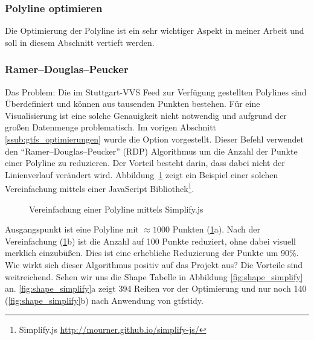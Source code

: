 \subsubsection{Polyline optimieren}
\label{ssub:polyline_optimieren}

  Die Optimierung der Polyline ist ein sehr wichtiger Aspekt in meiner Arbeit und soll in diesem Abschnitt vertieft werden.

  \subsubsection*{Ramer–Douglas–Peucker}
  \label{ssub:ramer_douglas_peucker}
    Das Problem: Die im Stuttgart-VVS Feed zur Verfügung gestellten Polylines sind Überdefiniert und können aus tausenden Punkten bestehen. Für eine Visualisierung ist eine solche Genauigkeit nicht notwendig und aufgrund der großen Datenmenge problematisch. Im vorigen Abschnitt \ref{ssub:gtfs_optimierungen} wurde die Option \colorbox{materialGrey}{\texttt{\color{white}{-s}}} vorgestellt. Dieser Befehl verwendet den "`Ramer–Douglas–Peucker"' (RDP) Algorithmus um die Anzahl der Punkte einer Polyline zu reduzieren. Der Vorteil besteht darin, dass dabei nicht der Linienverlauf verändert wird. Abbildung~\ref{fig:simplify} zeigt ein Beispiel einer solchen Vereinfachung mittels einer JavaScript Bibliothek\footnote{Simplify.js \url{http://mourner.github.io/simplify-js/}}.

    \begin{figure}[htbp]
      \centering
      \hfill
      \caption{Vereinfachung einer Polyline mittels Simplify.js}
      \label{fig:simplify}
    \end{figure}

    Ausgangspunkt ist eine Polyline mit $\approx1000$ Punkten (\ref{fig:simplify}a). Nach der Vereinfachung (\ref{fig:simplify}b) ist die Anzahl auf 100 Punkte reduziert, ohne dabei visuell merklich einzubüßen. Dies ist eine erhebliche Reduzierung der Punkte um 90\%. Wie wirkt sich dieser Algorithmus positiv auf das Projekt aus? Die Vorteile sind weitreichend. Sehen wir uns die Shape Tabelle in Abbildung \ref{fig:shape_simplify} an. \ref{fig:shape_simplify}a zeigt 394 Reihen vor der Optimierung und nur noch 140 (\ref{fig:shape_simplify}b) nach Anwendung von gtfstidy.

